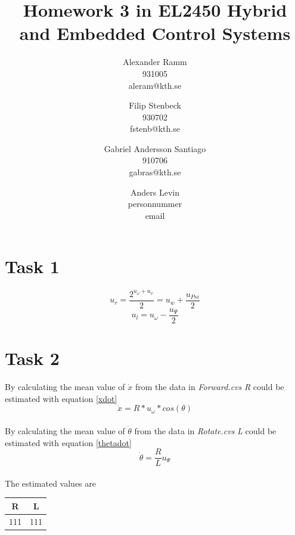 \documentclass[a4paper,12pt,oneside,onecolumn]{article} %
\begin{document}

\title{Homework 3 in EL2450 Hybrid and Embedded Control Systems}
\author{
  Alexander Ramm \\ 931005 \\ aleram@kth.se 
  \and 
  Filip Stenbeck \\ 930702 \\ fstenb@kth.se
  \and
  Gabriel Andersson Santiago \\ 910706 \\ gabras@kth.se
  \and
  Anders Levin \\ personnummer \\ email
  \and
  }

\maketitle                     %
\newpage







\section*{Task 1}

\begin{equation}
u_r = \frac{2^{u_{\omega} + u_{\psi}}}{2} = u_w + \frac{u_{Psi}}{2}
\end{equation}
\begin{equation}
u_l = u_\omega - \frac{u_\Psi}{2}
\end{equation}

\section*{Task 2}

By calculating the mean value of $\dot{x}$ from the data in \emph{Forward.cvs} \emph{R} could be estimated with equation \eqref{xdot}
\begin{equation}
\dot{x} = R*u_\omega*cos(\theta) \label{xdot}
\end{equation}
\\
By calculating the mean value of $\dot{\theta}$ from the data in \emph{Rotate.cvs} \emph{L} could be estimated with equation \eqref{thetadot}
\begin{equation}
\dot{\theta} = \frac{R}{L}u_\Psi\label{thetadot}
\end{equation}
\\
The estimated values are
\begin{center}
	\begin{tabular}{| c | c |}
	\hline
	R & L \\ \hline
	111 & 111 \\ \hline
	
	\end{tabular}
\end{center}
\end{document}

